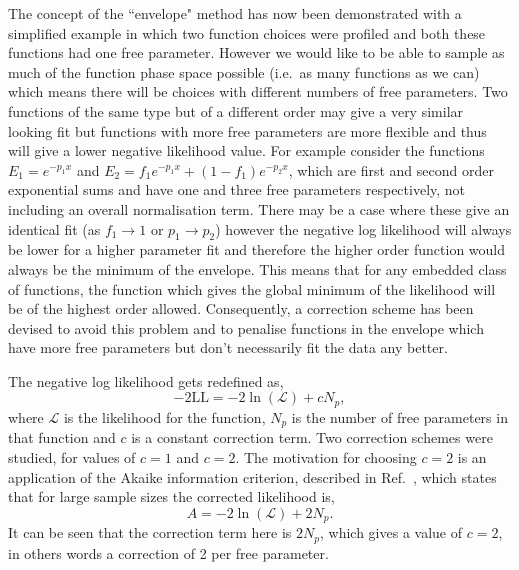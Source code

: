 The concept of the ``envelope" method has now been demonstrated with a simplified example in which two function choices were profiled and both these functions had one free parameter. However we would like to be able to sample as much of the function phase space possible (i.e.~as many functions as we can) which means there will be choices with different numbers of free parameters. Two functions of the same type but of a different order may give a very similar looking fit but functions with more free parameters are more flexible and thus will give a lower negative likelihood value. For example consider the functions $E_{1} = e^{-p_{1}x}$ and $E_{2} = f_{1}e^{-p_{1}x}+(1-f_{1})e^{-p_{2}x}$, which are first and second order exponential sums and have one and three free parameters respectively, not including an overall normalisation term. There may be a case where these give an identical fit (as $f_{1}\to 1$ or $p_{1}\to p_{2}$) however the negative log likelihood will always be lower for a higher parameter fit and therefore the higher order function would always be the minimum of the envelope. This means that for any embedded class of functions, the function which gives the global minimum of the likelihood will be of the highest order allowed. Consequently, a correction scheme has been devised to avoid this problem and to penalise functions in the envelope which have more free parameters but don't necessarily fit the data any better.

The negative log likelihood gets redefined as,
\begin{equation}
  -2\mathrm{LL} = -2\ln(\mathcal{L}) + cN_{p},
\end{equation}
where $\mathcal{L}$ is the likelihood for the function, $N_{p}$ is the number of free parameters in that function and $c$ is a constant correction term. Two correction schemes were studied, for values of $c=1$ and $c=2$. The motivation for choosing $c=2$ is an application of the Akaike information criterion, described in Ref.~\cite{akaike}, which states that for large sample sizes the corrected likelihood is,
\begin{equation}
  A = -2\ln(\mathcal{L}) + 2N_{p}.
\end{equation}
It can be seen that the correction term here is $2N_{p}$, which gives a value of $c=2$, in others words a correction of 2 per free parameter. 

